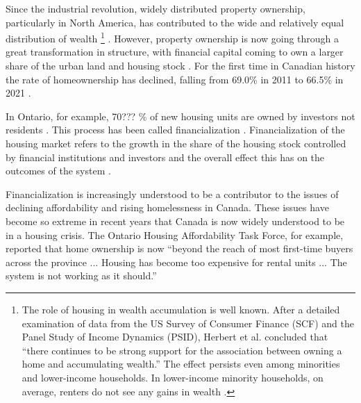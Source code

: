 Since the industrial revolution, widely distributed property ownership, particularly in North America, has contributed to the wide and relatively equal distribution of {wealth} \footnote{The role of housing in wealth accumulation is well known. After a detailed  examination of data from the US Survey of Consumer Finance (SCF) and the Panel Study of Income Dynamics (PSID), Herbert et al. concluded that ``there continues to be strong support for the association between owning a home and accumulating wealth.'' The effect persists even among minorities and lower-income households. In lower-income minority households, on average, renters do not see any gains in wealth \cite{herbertHomeownershipStillEffective2013}.} \cite{pikettyCapitalTwentyfirstCentury2014, harrisGrowthHomeOwnership1977, chevanGrowthHomeOwnership1989, andrewsEvolutionHomeownershipRates2011}. 
However, property ownership is now going through a great transformation in structure, with financial capital coming to own a larger share of the urban land and housing stock \cite{farhaReportFinancializationHousing2017, palleyFinancializationWhatIt2007}. For the first time in Canadian history the rate of homeownership has declined, falling from 69.0\%  in 2011 to 66.5\% in 2021 \cite{statisticscanadaBuyRentHousing2022}.

In Ontario, for example, 70??? \% of new housing units are owned by investors not residents \cite{GET77percent}. %
This process has been called financialization \cite{farhaReportFinancializationHousing2017, hansenFinanceCapitalismFinancialization2014}
\cite{tomaskovic-deveyFinancializationCausesInequality2013, palleyFinancializationWhatIt2007, seccarecciaUnderstandingFinancializationHistory2013, nemtinFinancializationHousingSocial2021}.  
Financialization of the housing market refers to the growth in the share of the housing stock controlled by financial institutions and investors and the overall effect this has on the outcomes of the system \cite{farhaReportFinancializationHousing2017, hansenFinanceCapitalismFinancialization2014}.  

Financialization is increasingly understood to be a contributor  to the issues of declining affordability and rising homelessness in Canada. These issues have become so extreme in recent years that Canada is now widely understood to be in a housing crisis. The Ontario Housing Affordability Task Force, for example, reported that home ownership is now ``beyond the reach of most first-time buyers across the province ... Housing has become too expensive for rental units ... The system is not working as it should.''

